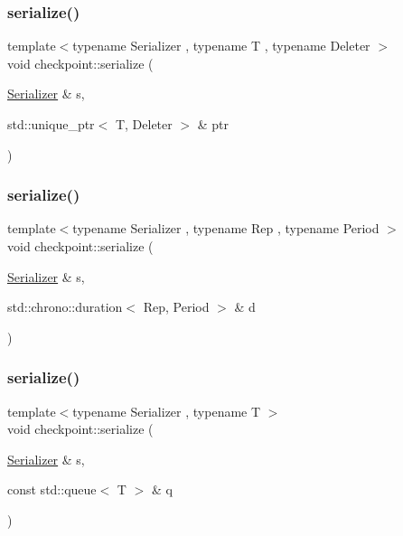 \subsubsection{\texorpdfstring{serialize()}{serialize()}\hspace{0.1cm}{\footnotesize\ttfamily [1/29]}}
{\footnotesize\ttfamily template$<$typename Serializer , typename T , typename Deleter $>$ \\
void checkpoint\+::serialize (\begin{DoxyParamCaption}\item[{\hyperlink{structcheckpoint_1_1_serializer}{Serializer} \&}]{s,  }\item[{std\+::unique\+\_\+ptr$<$ T, Deleter $>$ \&}]{ptr }\end{DoxyParamCaption})}

\mbox{\label{namespacecheckpoint_aec244476371c452d9d9318b9d5b24401}} 
\subsubsection{\texorpdfstring{serialize()}{serialize()}\hspace{0.1cm}{\footnotesize\ttfamily [2/29]}}
{\footnotesize\ttfamily template$<$typename Serializer , typename Rep , typename Period $>$ \\
void checkpoint\+::serialize (\begin{DoxyParamCaption}\item[{\hyperlink{structcheckpoint_1_1_serializer}{Serializer} \&}]{s,  }\item[{std\+::chrono\+::duration$<$ Rep, Period $>$ \&}]{d }\end{DoxyParamCaption})}

\mbox{\label{namespacecheckpoint_a5621e2549443d76acad6c83fdfdcbeab}} 
\subsubsection{\texorpdfstring{serialize()}{serialize()}\hspace{0.1cm}{\footnotesize\ttfamily [3/29]}}
{\footnotesize\ttfamily template$<$typename Serializer , typename T $>$ \\
void checkpoint\+::serialize (\begin{DoxyParamCaption}\item[{\hyperlink{structcheckpoint_1_1_serializer}{Serializer} \&}]{s,  }\item[{const std\+::queue$<$ T $>$ \&}]{q }\end{DoxyParamCaption})}

